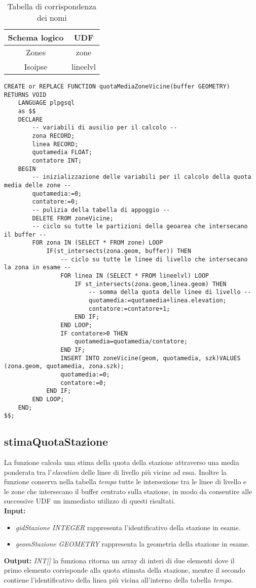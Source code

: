 \begin{table}[]
\centering
\caption{Tabella di corrispondenza dei nomi}
\label{mapTb1}
\begin{tabular}{|c|c|}
\hline
Schema logico & UDF      \\ \hline
Zones         & zone     \\
Isoipse       & lineelvl \\ \hline
\end{tabular}
\end{table}

\newpage
\begin{lstlisting}[style=mySQL]
CREATE or REPLACE FUNCTION quotaMediaZoneVicine(buffer GEOMETRY) RETURNS VOID
	LANGUAGE plpgsql
	as $$
	DECLARE
		-- variabili di ausilio per il calcolo --
		zona RECORD;
		linea RECORD;
		quotamedia FLOAT;
		contatore INT;
	BEGIN
		-- inizializzazione delle variabili per il calcolo della quota media delle zone --
		quotamedia:=0;
		contatore:=0;
		-- pulizia della tabella di appoggio --
		DELETE FROM zoneVicine;
		-- ciclo su tutte le partizioni della geoarea che intersecano il buffer --
		FOR zona IN (SELECT * FROM zone) LOOP
			IF(st_intersects(zona.geom, buffer)) THEN
				-- ciclo su tutte le linee di livello che intersecano la zona in esame --
				FOR linea IN (SELECT * FROM lineelvl) LOOP
					IF st_intersects(zona.geom,linea.geom) THEN
						-- somma della quota delle linee di livello --
						quotamedia:=quotamedia+linea.elevation;
						contatore:=contatore+1;
					END IF;
				END LOOP;
				IF contatore>0 THEN
					quotamedia=quotamedia/contatore;
				END IF;
				INSERT INTO zoneVicine(geom, quotamedia, szk)VALUES (zona.geom, quotamedia, zona.szk);
				quotamedia:=0;
				contatore:=0;
			END IF;
		END LOOP;
	END;
$$;
\end{lstlisting}

\subsection{stimaQuotaStazione}
La funzione calcola una stima della quota della stazione attraverso una media ponderata tra l'\textit{elavation} delle linee di livello più vicine ad essa. Inoltre la funzione conserva nella tabella \textit{tempo} tutte le intersezione tra le linee di livello e le zone che intersecano il buffer centrato sulla stazione, in modo da consentire alle successive UDF un immediato utilizzo di questi risultati.\\
\textbf{Input:} 
\begin{itemize}
\item \textit{gidStazione INTEGER} rappresenta l'identificativo della stazione in esame.
\item \textit{geomStazione GEOMETRY} rappresenta la geometria della stazione in esame.
\end{itemize}
\textbf{Output:} \textit{INT[]} la funziona ritorna un array di interi di due elementi dove il primo elemento corrisponde alla quota stimata della stazione, mentre il secondo contiene l'identificativo della linea più vicina all'interno della tabella \textit{tempo}.


